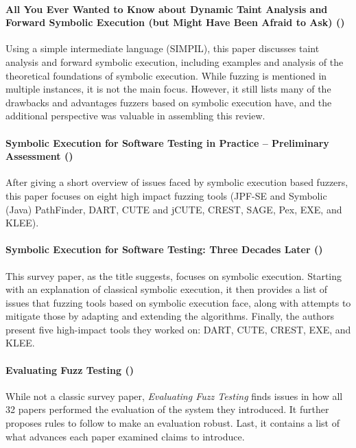\documentclass{article}
\begin{document}
\begin{multicols}{2}
    \paragraph{All You Ever Wanted to Know about Dynamic Taint Analysis and Forward Symbolic Execution (but Might Have Been Afraid to Ask) (\citeyear{AllYouEverWanted})}
    Using a simple intermediate language (SIMPIL), this paper discusses taint analysis and forward symbolic execution, including examples and analysis of the theoretical foundations of symbolic execution. While fuzzing is mentioned in multiple instances, it is not the main focus. However, it still lists many of the drawbacks and advantages fuzzers based on symbolic execution have, and the additional perspective was valuable in assembling this review.

    \paragraph{Symbolic Execution for Software Testing in Practice – Preliminary Assessment (\citeyear{PreliminaryAssessment})}
    After giving a short overview of issues faced by symbolic execution based fuzzers, this paper focuses on eight high impact fuzzing tools (JPF-SE and Symbolic (Java) PathFinder\cite{JPFSE, JavaPathFinder}, DART\cite{DART}, CUTE\cite{CUTE} and jCUTE\cite{ExplicitPathModelChecking}, CREST\cite{CREST}, SAGE\cite{SAGE}, Pex\cite{Pex}, EXE\cite{EXE}, and KLEE\cite{KLEE}).

    \paragraph{Symbolic Execution for Software Testing: Three Decades Later (\citeyear{ReviewThreeDecades})}
    This survey paper, as the title suggests, focuses on symbolic execution. Starting with an explanation of classical symbolic execution, it then provides a list of issues that fuzzing tools based on symbolic execution face, along with attempts to mitigate those by adapting and extending the algorithms. Finally, the authors present five high-impact tools they worked on: DART\cite{DART}, CUTE\cite{CUTE}, CREST\cite{CREST}, EXE\cite{EXE}, and KLEE\cite{KLEE}.\cite{ReviewThreeDecades}

    \paragraph{Evaluating Fuzz Testing (\citeyear{ReviewThreeDecades})}
    While not a classic survey paper, \textit{Evaluating Fuzz Testing} finds issues in how all 32 papers performed the evaluation of the system they introduced. It further proposes rules to follow to make an evaluation robust. Last, it contains a list of what advances each paper examined claims to introduce.\cite{EvaluatingFuzzTesting}


\end{multicols}
\end{document}
